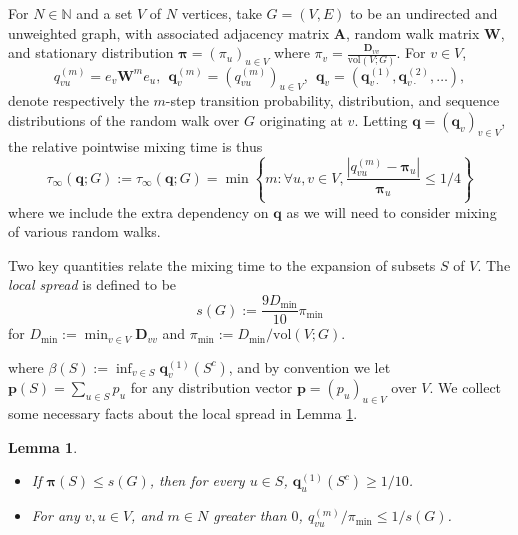 \documentclass{article}
\newcommand{\set}[1]{\left\{#1\right\}}
\newcommand{\vol}{\mathrm{vol}}
\newcommand{\abs}[1]{\left \lvert #1 \right \rvert}
\newcommand{\1}{\mathbf{1}}
\newcommand{\pbf}{\mathbf{p}}
\newcommand{\qbf}{\mathbf{q}}
\newcommand{\pibf}{\bm{\pi}}
\newcommand{\Abf}{\mathbf{A}}
\newcommand{\Wbf}{\mathbf{W}}
\newcommand{\Dbf}{\mathbf{D}}
\theoremstyle{aldenthm}
\newtheorem{lemma}{Lemma}
\begin{document}
For $N \in \mathbb{N}$ and a set $V$ of $N$ vertices, take $G = (V,E)$ to be an undirected and unweighted graph, with associated adjacency matrix $\Abf$, random walk matrix $\Wbf$, and stationary distribution $\pibf = (\pi_u)_{u \in V}$ where $\pi_v = \frac{\Dbf_{vv}}{\vol(V; G)}$. For $v \in V$, 
\begin{equation}
\label{eqn: random_walk}
q_{vu}^{(m)} = e_v\Wbf^m e_u, ~~ \qbf_{v}^{(m)} = \left(q_{vu}^{(m)}\right)_{u \in V}, ~~ \qbf_v = (\qbf^{(1)}_{v\cdot},\qbf^{(2)}_{v\cdot}, \ldots), 
\end{equation}
denote respectively the $m$-step transition probability, distribution, and sequence distributions of the random walk over $G$ originating at $v$. Letting $\qbf = (\qbf_v)_{v \in V}$, the relative pointwise mixing time is thus
\begin{equation*}
\tau_{\infty}(\qbf; G) := \tau_{\infty}(\qbf; G) = \min\set{m: \forall u,v \in V, \frac{\abs{q_{vu}^{(m)} - \pibf_u}}{\pibf_u} \leq 1/4} 
\end{equation*}
where we include the extra dependency on $\qbf$ as we will need to consider mixing of various random walks. 

Two key quantities relate the mixing time to the expansion of subsets $S$ of $V$. The \emph{local spread} is defined to be
\begin{equation*}
s(G) := \frac{9D_{\min}}{10}\pi_{\min} 
\end{equation*}
for $D_{\min} := \min_{v \in V} \Dbf_{vv}$ and $\pi_{\min} := D_{\min} / \vol(V; G)$.


where $\beta(S) := \inf_{v \in S} \qbf_{v}^{(1)}(S^c)$, and by convention we let $\pbf(S) = \sum_{u \in S} p_u$ for any distribution vector $\pbf = (p_u)_{u \in V}$ over $V$. We collect some necessary facts about the local spread in Lemma \ref{lem: local_spread_G}.
\begin{lemma}
	\label{lem: local_spread_G}
	\begin{itemize}
		\item If $\pibf(S) \leq s(G)$, then for every $u \in S$, $\qbf_u^{(1)}(S^c) \geq 1/10$.
		\item For any $v, u \in V$, and $m \in N$ greater than $0$, $q_{vu}^{(m)}/ \pi_{\min} \leq 1/s(G)$.
	\end{itemize}
	
\end{lemma}
\end{document}
